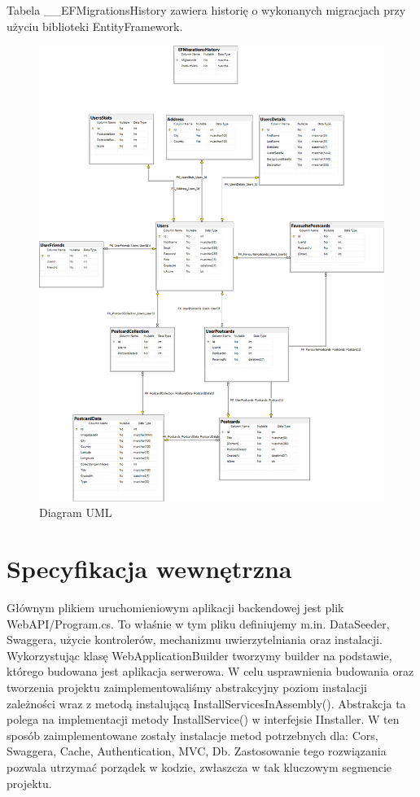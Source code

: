 \documentclass[a4paper,twoside,12pt]{book}
\begin{document}
Tabela \_\_EFMigrationsHistory zawiera historię o wykonanych migracjach przy użyciu biblioteki EntityFramework. 

\begin{figure}[H]
    \centering
    \includegraphics[width=1\textwidth]{diagram1.png}
    \caption{Diagram UML}
    \label{Kompilator}
\end{figure}

\section{Specyfikacja wewnętrzna}
Głównym plikiem uruchomieniowym aplikacji backendowej jest plik WebAPI/Program.cs. To właśnie w tym pliku definiujemy m.in. DataSeeder, Swaggera, użycie kontrolerów, mechanizmu uwierzytelniania oraz instalacji. Wykorzystując klasę WebApplicationBuilder tworzymy builder na podstawie, którego budowana jest aplikacja serwerowa. W celu usprawnienia budowania oraz tworzenia projektu zaimplementowaliśmy abstrakcyjny poziom instalacji zależności wraz z metodą instalującą InstallServicesInAssembly(). Abstrakcja ta polega na implementacji metody InstallService() w interfejsie IInstaller. W ten sposób zaimplementowane zostały instalacje metod potrzebnych dla: Cors, Swaggera, Cache, Authentication, MVC, Db. Zastosowanie tego rozwiązania pozwala utrzymać porządek w kodzie, zwłaszcza w tak kluczowym segmencie projektu. 
\end{document}
